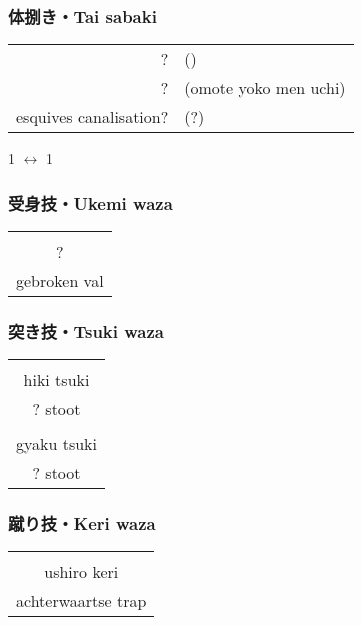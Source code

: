 \subsubsection{体捌き・Tai sabaki}
\begin{table}[H]
\begin{center}
\begin{tabular}{rl}
    ? & (\ruby{}{})\\
    ? & (omote yoko men uchi)\\
    esquives canalisation? & (?)
\end{tabular}
\end{center}
\label{kyuu_3_taisabaki}
\end{table}
\begin{center}
    1 $\leftrightarrow$ 1
\end{center}

\subsubsection{受身技・Ukemi waza}
\begin{table}[H]
\begin{center}
\begin{tabular}{c}
    \ruby{}{}\\
    ?\\
    gebroken val
\end{tabular}
\end{center}
\label{kyuu_3_ukemi_waza}
\end{table}

\subsubsection{突き技・Tsuki waza}
\begin{table}[H]
\begin{center}
\begin{tabular}{c}
    \ruby{}{}\\
    hiki tsuki\\
    ? stoot\\
    \hline
    \ruby{}{}\\
    gyaku tsuki\\
    ? stoot
\end{tabular}
\end{center}
\label{kyuu_3_tsuki_waza}
\end{table}

\subsubsection{蹴り技・Keri waza}
\begin{table}[H]
\begin{center}
\begin{tabular}{c}
    \ruby{}{}\ruby{}{}\\
    ushiro keri\\
    achterwaartse trap
\end{tabular}
\end{center}
\label{kyuu_3_keri_waza}
\end{table}

